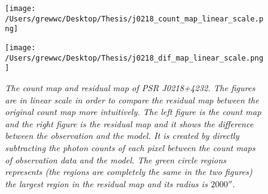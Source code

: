 \documentclass[12pt]{report}
\newcommand{\mycaption}[1]{\caption{\textit{\footnotesize #1}}}
\newcommand{\change}[1]{
  $<$\colorbox{red}{\textbf{change}}$>$#1$<$\colorbox{red}{\textbf{/change}}$>$
}
\begin{document}

            \begin{figure}[!ht]
              \begin{center}
              \begin{minipage}{0.45\textwidth}
                \begin{center} 
                  \texttt{[image: /Users/grewwc/Desktop/Thesis/j0218\_count\_map\_linear\_scale.png]}
                \end{center}
              \end{minipage}
              \begin{minipage}{0.45\textwidth}
                \begin{center}
                  \texttt{[image: /Users/grewwc/Desktop/Thesis/j0218\_dif\_map\_linear\_scale.png]}
                \end{center}
              \end{minipage}
            \end{center}
  
              \centering
              \begin{minipage}{0.8\textwidth}
                \mycaption{The count map and residual map of PSR J0218+4232.
                  The figures are in linear scale in order to compare the residual map between the 
                  original count map more intuitively. The left figure is the count map and the right 
                  figure is the residual map and it shows the difference between the observation and the model.
                  It is created by directly subtracting the photon counts of each pixel between the count maps 
                  of observation data and the model. The green circle regions represents (the regions 
                  are completely the same in the two figures)
                  the largest region in the residual map and its radius is $2000''$.}
                \label{fig: j0218_count_map_diff}
              \end{minipage}
            \end{figure}
\end{document}
